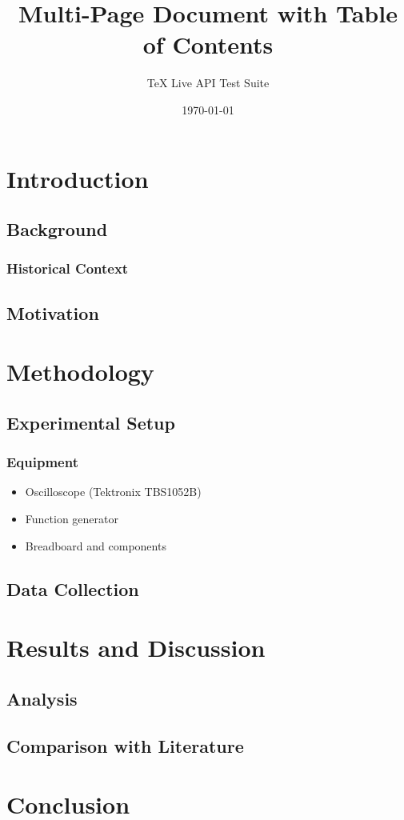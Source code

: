 \documentclass[12pt]{report}
\title{Multi-Page Document with Table of Contents}
\author{TeX Live API Test Suite}
\date{\today}
\begin{document}
\maketitle
\tableofcontents
\newpage

\chapter{Introduction}
\lipsum[1-2]

\section{Background}
\lipsum[3]

\subsection{Historical Context}
\lipsum[4]

\section{Motivation}
\lipsum[5-6]

\chapter{Methodology}
\lipsum[7-8]

\section{Experimental Setup}
\lipsum[9]

\subsection{Equipment}
\begin{itemize}
  \item Oscilloscope (Tektronix TBS1052B)
  \item Function generator
  \item Breadboard and components
\end{itemize}

\lipsum[10]

\section{Data Collection}
\lipsum[11-12]

\chapter{Results and Discussion}
\lipsum[13-15]

\section{Analysis}
\lipsum[16]

\section{Comparison with Literature}
\lipsum[17-18]

\chapter{Conclusion}
\lipsum[19-20]
\end{document}
